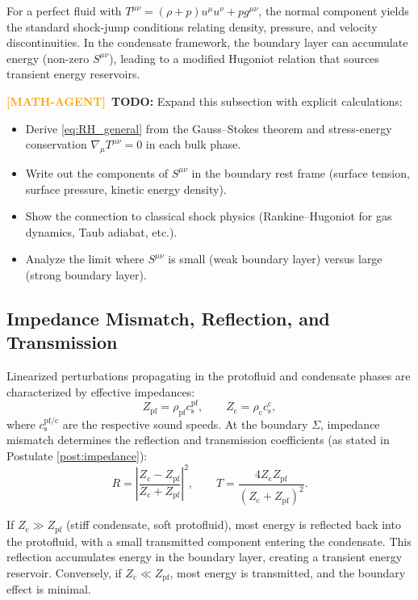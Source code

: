 \documentclass[11pt,a4paper]{article}
\newcommand{\cs}{c_{\mathrm{s}}}
\newcommand{\Zpf}{Z_{\mathrm{pf}}}
\newcommand{\Zcond}{Z_{\mathrm{c}}}
\theoremstyle{definition}
\newcommand{\MATHAGENT}{\textcolor{orange}{\textbf{[MATH-AGENT]}}}
\begin{document}
For a perfect fluid with $T^{\mu\nu} = (\rho + p) u^\mu u^\nu + p g^{\mu\nu}$, the normal component yields the standard shock-jump conditions relating density, pressure, and velocity discontinuities. In the condensate framework, the boundary layer can accumulate energy (non-zero $S^{\mu\nu}$), leading to a modified Hugoniot relation that sources transient energy reservoirs.

\MATHAGENT~\textbf{TODO:} Expand this subsection with explicit calculations:
\begin{itemize}
  \item Derive \eqref{eq:RH_general} from the Gauss--Stokes theorem and stress-energy conservation $\nabla_\mu T^{\mu\nu} = 0$ in each bulk phase.
  \item Write out the components of $S^{\mu\nu}$ in the boundary rest frame (surface tension, surface pressure, kinetic energy density).
  \item Show the connection to classical shock physics (Rankine--Hugoniot for gas dynamics, Taub adiabat, etc.).
  \item Analyze the limit where $S^{\mu\nu}$ is small (weak boundary layer) versus large (strong boundary layer).
\end{itemize}

\subsection{Impedance Mismatch, Reflection, and Transmission}
\label{sec:impedance_detail}

Linearized perturbations propagating in the protofluid and condensate phases are characterized by effective impedances:
\begin{equation}
\label{eq:impedances}
\Zpf = \rho_{\mathrm{pf}} \cs^{\mathrm{pf}}, \qquad \Zcond = \rho_{\mathrm{c}} \cs^{\mathrm{c}},
\end{equation}
where $\cs^{\mathrm{pf/c}}$ are the respective sound speeds. At the boundary $\Sigma$, impedance mismatch determines the reflection and transmission coefficients (as stated in Postulate \ref{post:impedance}):
\begin{equation}
\label{eq:RT_repeat}
R = \left| \frac{\Zcond - \Zpf}{\Zcond + \Zpf} \right|^2, \qquad T = \frac{4 \Zcond \Zpf}{(\Zcond + \Zpf)^2}.
\end{equation}

If $\Zcond \gg \Zpf$ (stiff condensate, soft protofluid), most energy is reflected back into the protofluid, with a small transmitted component entering the condensate. This reflection accumulates energy in the boundary layer, creating a transient energy reservoir. Conversely, if $\Zcond \ll \Zpf$, most energy is transmitted, and the boundary effect is minimal.
\end{document}
